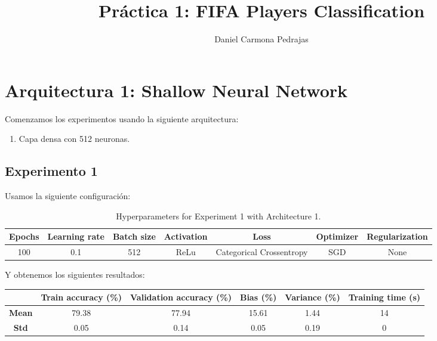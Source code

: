 \documentclass{article}
\begin{document}
\title{Pr\'actica 1: FIFA Players Classification}

\author{{Daniel Carmona Pedrajas}}

\date{}
\maketitle



\section{Arquitectura 1: Shallow Neural Network}
	Comenzamos los experimentos usando la siguiente arquitectura:
	\begin{enumerate}
		\item Capa densa con 512 neuronas.
	\end{enumerate}
	\subsection{Experimento 1}
		Usamos la siguiente configuraci\'on:
		\begin{table}[h]
			\begin{center}
				\begin{tabular}{ c | c | c | c | c | c | c }
					\textbf{Epochs} & \textbf{Learning rate} & \textbf{Batch size} & \textbf{Activation} & \textbf{Loss} & \textbf{Optimizer} & \textbf{Regularization} \\ \hline
					100 & 0.1 & 512 & ReLu & Categorical Crossentropy & SGD & None
				\end{tabular}
				\caption{Hyperparameters for Experiment 1 with Architecture 1.}
				\label{tab:exp1-1}
			\end{center}
		\end{table}
		
		Y obtenemos los siguientes resultados:
		\begin{table}[h]
			\begin{center}
				\begin{tabular}{ c | c | c | c | c | c |}
					\ & \textbf{Train accuracy (\%)} & \textbf{Validation accuracy (\%)} & \textbf{Bias (\%)} & \textbf{Variance (\%)} & \textbf{Training time (s)} \\ \hline
					\textbf{Mean} & 79.38 & 77.94 & 15.61 & 1.44 & 14\\ \hline
					\textbf{Std} & 0.05 & 0.14 & 0.05 & 0.19 & 0 \\ \hline
				\end{tabular}
			\end{center}
		\end{table}
		
\end{document}
